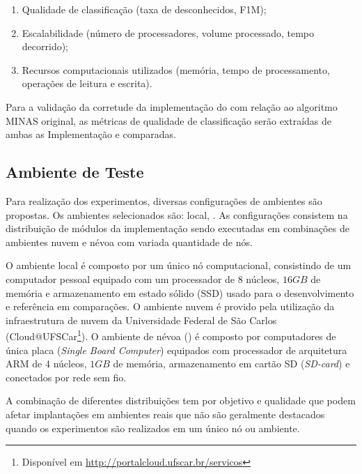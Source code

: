 \begin{enumerate}[label={\alph*)}]
  \item Qualidade de classificação (taxa de desconhecidos, F1M);
  \item Escalabilidade (número de processadores, volume processado, tempo
  decorrido);
  \item Recursos computacionais utilizados (memória, tempo de processamento,
  operações de leitura e escrita).
\end{enumerate}

Para a validação da corretude da implementação do \mfog com relação ao algoritmo
MINAS original, as métricas de qualidade de classificação serão extraídas de
ambas as Implementação e comparadas.


\subsection{Ambiente de Teste}

Para realização dos experimentos, diversas configurações de ambientes são
propostas.
Os ambientes selecionados são: local, 
.
As configurações consistem na distribuição de módulos da implementação \mfog
sendo executadas em combinações de ambientes nuvem e névoa com variada
quantidade de nós.

O ambiente local é composto por um único nó computacional, consistindo de um
computador pessoal equipado com um processador de 8 núcleos, $16GB$ de memória e
armazenamento em estado sólido (SSD) usado para o desenvolvimento e referência
em comparações.
O ambiente nuvem é provido pela utilização da infraestrutura de nuvem da
Universidade Federal de São Carlos (Cloud@UFSCar\footnote{Disponível em
\url{http://portalcloud.ufscar.br/servicos}}).
O ambiente de névoa (\fog) é composto por computadores de única placa
(\emph{Single Board Computer}) equipados com processador de arquitetura ARM de 4
núcleos, $1GB$ de memória, armazenamento em cartão SD (\emph{SD-card}) e
conectados por rede sem fio.

A combinação de diferentes distribuições tem por objetivo  e qualidade que podem afetar implantações em ambientes reais que não
são geralmente destacados quando os experimentos são realizados em um único
nó ou ambiente.

